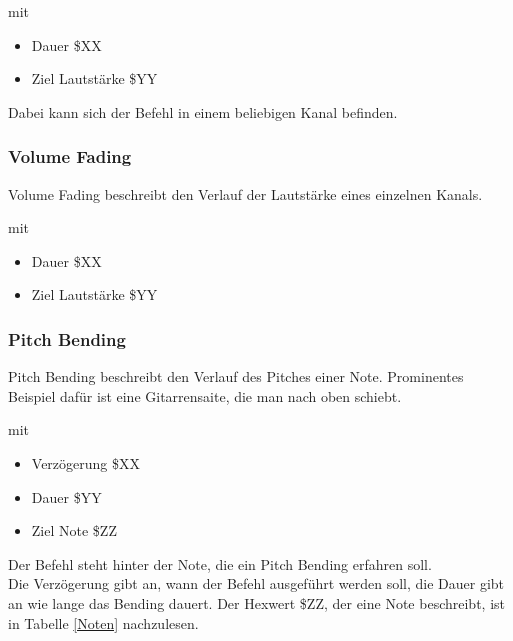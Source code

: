 \medskip

mit

\begin{itemize}
	\item Dauer \$XX 
	\item Ziel Lautstärke \$YY
\end{itemize}

Dabei kann sich der Befehl in einem beliebigen Kanal befinden.

\subsubsection{Volume Fading}

Volume Fading beschreibt den Verlauf der Lautstärke eines einzelnen Kanals.

\medskip



\medskip

mit 

\begin{itemize}
	\item Dauer \$XX
	\item Ziel Lautstärke \$YY 
\end{itemize}

\subsubsection{Pitch Bending}

Pitch Bending beschreibt den Verlauf des Pitches einer Note. Prominentes Beispiel dafür ist eine Gitarrensaite, die man nach oben schiebt.

\medskip



\medskip

mit

\begin{itemize}
	\item Verzögerung \$XX
	\item Dauer \$YY
	\item Ziel Note \$ZZ
\end{itemize}

Der Befehl steht hinter der Note, die ein Pitch Bending erfahren soll. \\
Die Verzögerung gibt an, wann der Befehl ausgeführt werden soll, die Dauer gibt an wie lange das Bending dauert. Der Hexwert \$ZZ, der eine Note beschreibt, ist in Tabelle \ref{Noten} nachzulesen.

